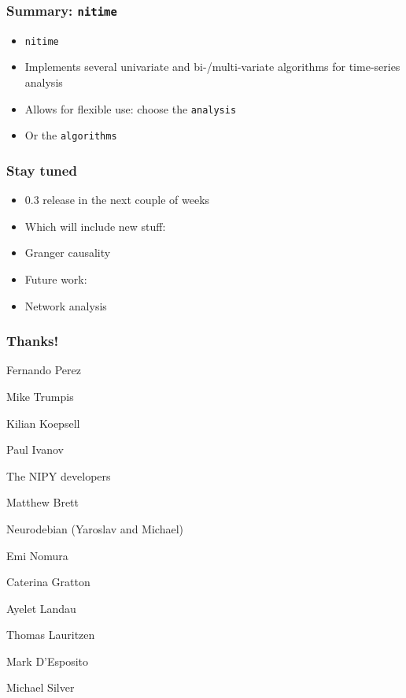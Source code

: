 \documentclass{beamer}
\begin{document}
\begin{frame}
\frametitle{Summary: \tt{nitime}}
\begin{itemize}
\pause
\item
\tt{nitime} 
\pause
\item
Implements several univariate and bi-/multi-variate algorithms for time-series
analysis 
\pause
\item
Allows for flexible use: choose the \tt{analysis} 
\pause
\item
Or the \tt{algorithms} 

\end{itemize}
\end{frame}

\begin{frame}
\frametitle{Stay tuned}
\begin{itemize}

\pause
\item
0.3 release in the next couple of weeks

\pause
\item
Which will include new stuff: 

\pause
\item
Granger causality

\pause
\item
Future work: 

\pause
\item
Network analysis 

\end{itemize}
\end{frame}

\begin{frame}
\frametitle{Thanks!}
\pause
Fernando Perez

Mike Trumpis

Kilian Koepsell

Paul Ivanov

\pause
The NIPY developers

Matthew Brett 

\pause
Neurodebian (Yaroslav and Michael)

\pause
Emi Nomura 

Caterina Gratton 

Ayelet Landau 

Thomas Lauritzen

\pause
Mark D'Esposito 

Michael Silver
\end{frame}
\end{document}
